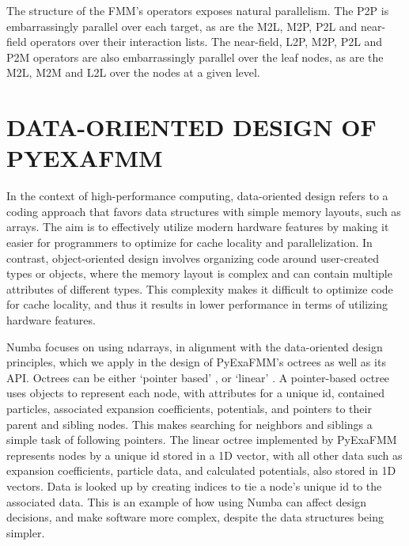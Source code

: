 \documentclass{IEEEcsmag}
\begin{document}
The structure of the FMM's operators exposes natural parallelism. The P2P is embarrassingly parallel over each target, as are the M2L, M2P, P2L and near-field operators over their interaction lists. The near-field, L2P, M2P, P2L and P2M operators are also embarrassingly parallel over the leaf nodes, as are the M2L, M2M and L2L over the nodes at a given level.

\section{DATA-ORIENTED DESIGN OF PYEXAFMM}

In the context of high-performance computing, data-oriented design refers to a coding approach that favors data structures with simple memory layouts, such as arrays. The aim is to effectively utilize modern hardware features by making it easier for programmers to optimize for cache locality and parallelization.
In contrast, object-oriented design involves organizing code around user-created types or objects, where the memory layout is complex and can contain multiple attributes of different types. 
This complexity makes it difficult to optimize code for cache locality, and thus it results in lower performance in terms of utilizing hardware features.

Numba focuses on using ndarrays, in alignment with the data-oriented design principles, which we apply in the design of PyExaFMM's octrees as well as its API.
Octrees can be either `pointer based' \cite{Wang2021}, or `linear' \cite{Sundar2007}. A pointer-based octree uses objects to represent each node, with attributes for a unique id, contained particles, associated expansion coefficients, potentials, and pointers to their parent and sibling nodes. This makes searching for neighbors and siblings a simple task of following pointers. The linear octree implemented by PyExaFMM represents nodes by a unique id stored in a 1D vector, with all other data such as expansion coefficients, particle data, and calculated potentials, also stored in 1D vectors. Data is looked up by creating indices to tie a node's unique id to the associated data. This is an example of how using Numba can affect design decisions, and make software more complex, despite the data structures being simpler.
\end{document}
